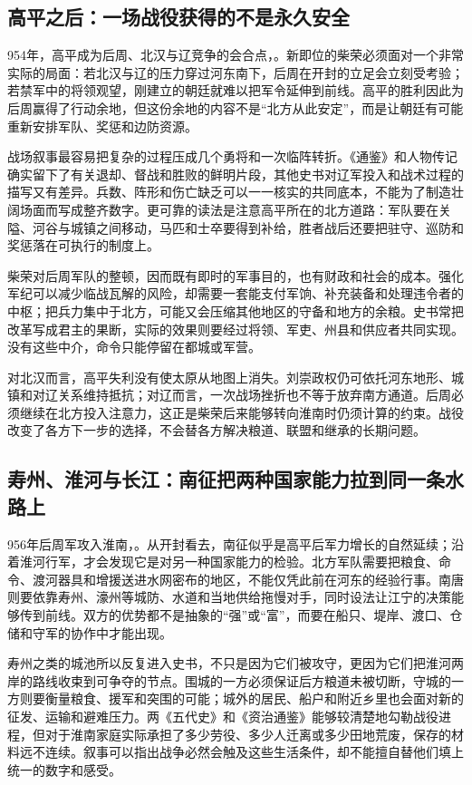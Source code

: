 \subsection{高平之后：一场战役获得的不是永久安全}

954年，高平成为后周、北汉与辽竞争的会合点，。新即位的柴荣必须面对一个非常实际的局面：若北汉与辽的压力穿过河东南下，后周在开封的立足会立刻受考验；若禁军中的将领观望，刚建立的朝廷就难以把军令延伸到前线。高平的胜利因此为后周赢得了行动余地，但这份余地的内容不是“北方从此安定”，而是让朝廷有可能重新安排军队、奖惩和边防资源。

战场叙事最容易把复杂的过程压成几个勇将和一次临阵转折。《通鉴》和人物传记确实留下了有关退却、督战和胜败的鲜明片段，其他史书对辽军投入和战术过程的描写又有差异。兵数、阵形和伤亡缺乏可以一一核实的共同底本，不能为了制造壮阔场面而写成整齐数字。更可靠的读法是注意高平所在的北方道路：军队要在关隘、河谷与城镇之间移动，马匹和士卒要得到补给，胜者战后还要把驻守、巡防和奖惩落在可执行的制度上。

柴荣对后周军队的整顿，因而既有即时的军事目的，也有财政和社会的成本。强化军纪可以减少临战瓦解的风险，却需要一套能支付军饷、补充装备和处理违令者的中枢；把兵力集中于北方，可能又会压缩其他地区的守备和地方的余粮。史书常把改革写成君主的果断，实际的效果则要经过将领、军吏、州县和供应者共同实现。没有这些中介，命令只能停留在都城或军营。

对北汉而言，高平失利没有使太原从地图上消失。刘崇政权仍可依托河东地形、城镇和对辽关系维持抵抗；对辽而言，一次战场挫折也不等于放弃南方通道。后周必须继续在北方投入注意力，这正是柴荣后来能够转向淮南时仍须计算的约束。战役改变了各方下一步的选择，不会替各方解决粮道、联盟和继承的长期问题。

\subsection{寿州、淮河与长江：南征把两种国家能力拉到同一条水路上}

956年后周军攻入淮南，。从开封看去，南征似乎是高平后军力增长的自然延续；沿着淮河行军，才会发现它是对另一种国家能力的检验。北方军队需要把粮食、命令、渡河器具和增援送进水网密布的地区，不能仅凭此前在河东的经验行事。南唐则要依靠寿州、濠州等城防、水道和当地供给拖慢对手，同时设法让江宁的决策能够传到前线。双方的优势都不是抽象的“强”或“富”，而要在船只、堤岸、渡口、仓储和守军的协作中才能出现。

寿州之类的城池所以反复进入史书，不只是因为它们被攻守，更因为它们把淮河两岸的路线收束到可争夺的节点。围城的一方必须保证后方粮道未被切断，守城的一方则要衡量粮食、援军和突围的可能；城外的居民、船户和附近乡里也会面对新的征发、运输和避难压力。两《五代史》和《资治通鉴》能够较清楚地勾勒战役进程，但对于淮南家庭实际承担了多少劳役、多少人迁离或多少田地荒废，保存的材料远不连续。叙事可以指出战争必然会触及这些生活条件，却不能擅自替他们填上统一的数字和感受。

